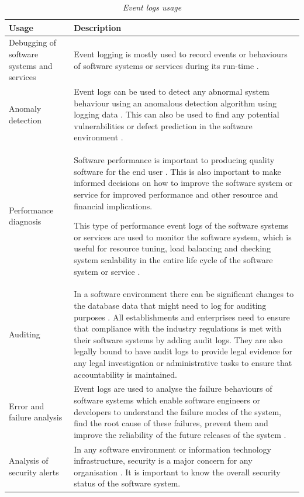 \begin{table}[!htb]
	\centering
	\caption[Event logs usage]
	{\textit{Event logs usage}}
	\label{tbl:ch1_eventLogsUsage}
	\begin{tabularx}{\textwidth}{|l|X|}
		\hline \textbf{Usage} & \textbf{Description} \\
		\hline Debugging of software systems and services & Event logging is mostly used to record events or behaviours of software systems or services during its run-time \cite{Rong2018a}.\\
		\hline Anomaly detection & Event logs can be used to detect any abnormal system behaviour using an anomalous detection algorithm using logging data \cite{Gurumdimma2016}. This can also be used to find any potential vulnerabilities or defect prediction in the software environment \cite{Dwyer2013}. \\
		\hline Performance diagnosis & Software performance is important to producing quality software for the end user \cite{EvangelinGeetha2007, Baccanico2014}. This is also important to make informed decisions on how to improve the software system or service for improved performance and other resource and financial implications.\par This type of performance event logs of the software systems or services are used to monitor the software system, which is useful for resource tuning, load balancing and checking system scalability in the entire life cycle of the software system or service \cite{Song2017}. \\ 
		\hline Auditing & In a software environment there can be significant changes to the database data that might need to log for auditing purposes \cite{Rong2018a}. All establishments and enterprises need to ensure that compliance with the industry regulations is met with their software systems by adding audit logs. They are also legally bound to have audit logs to provide legal evidence for any legal investigation or administrative tasks to ensure that accountability is maintained. \\
		\hline Error and failure analysis & Event logs are used to analyse the failure behaviours of software systems which enable software engineers or developers to understand the failure modes of the system, find the root cause of these failures, prevent them and improve the reliability of the future releases of the system \cite{Cinque2013}.\\
		\hline Analysis of security alerts & In any software environment or information technology infrastructure, security is a major concern for any organisation \cite{Pathan2014, Dwyer2013}. It is important to know the overall security status of the software system. \\
		\hline
	\end{tabularx}
\end{table}

